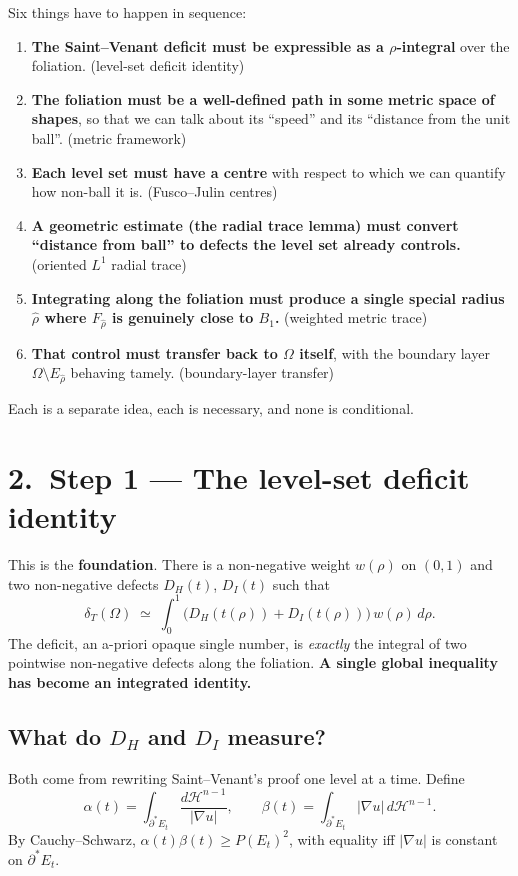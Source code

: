 \documentclass[11pt,a4paper]{article}
\newcommand{\rhad}{\widehat{\rho}}
\newcommand{\deltaT}{\delta_T}
\begin{document}
Six things have to happen in sequence:
\begin{enumerate}[leftmargin=*,itemsep=2pt]
\item \textbf{The Saint--Venant deficit must be expressible as a $\rho$-integral} over the foliation. (level-set deficit identity)
\item \textbf{The foliation must be a well-defined path in some metric space of shapes}, so that we can talk about its ``speed'' and its ``distance from the unit ball''. (metric framework)
\item \textbf{Each level set must have a centre} with respect to which we can quantify how non-ball it is. (Fusco--Julin centres)
\item \textbf{A geometric estimate (the radial trace lemma) must convert ``distance from ball'' to defects the level set already controls.} (oriented $L^1$ radial trace)
\item \textbf{Integrating along the foliation must produce a single special radius $\rhad$ where $F_{\rhad}$ is genuinely close to $B_1$.} (weighted metric trace)
\item \textbf{That control must transfer back to $\Omega$ itself}, with the boundary layer $\Omega \setminus E_{\rhad}$ behaving tamely. (boundary-layer transfer)
\end{enumerate}

Each is a separate idea, each is necessary, and none is conditional.

\section*{2.\ Step 1 --- The level-set deficit identity}

This is the \textbf{foundation}. There is a non-negative weight $w(\rho)$ on $(0,1)$ and two non-negative defects $D_H(t)$, $D_I(t)$ such that
\[
\deltaT(\Omega) \;\simeq\; \int_{0}^{1} \bigl(D_H(t(\rho)) + D_I(t(\rho))\bigr)\, w(\rho)\, d\rho.
\]
The deficit, an a-priori opaque single number, is \emph{exactly} the integral of two pointwise non-negative defects along the foliation. \textbf{A single global inequality has become an integrated identity.}

\subsection*{What do $D_H$ and $D_I$ measure?}

Both come from rewriting Saint--Venant's proof one level at a time. Define
\[
\alpha(t) = \int_{\partial^* E_t} \frac{d\mathcal{H}^{n-1}}{|\nabla u|},
\qquad
\beta(t) = \int_{\partial^* E_t} |\nabla u|\, d\mathcal{H}^{n-1}.
\]
By Cauchy--Schwarz, $\alpha(t)\beta(t) \ge P(E_t)^2$, with equality iff $|\nabla u|$ is constant on $\partial^* E_t$.
\end{document}
